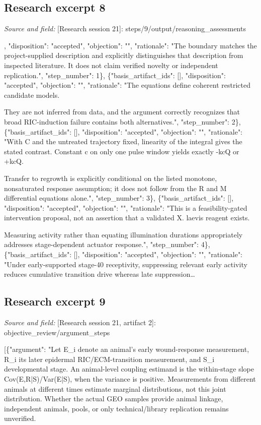 \documentclass[11pt]{article}
\begin{document}
\subsection{Research excerpt 8}
\textit{Source and field: }[Research session 21]: steps/9/output/reasoning\_assessments\par
[\{"basis\_artifact\_ids": [], "disposition": "accepted", "objection": "", "rationale": "The boundary matches the project-supplied description and explicitly distinguishes that description from inspected literature. It does not claim verified novelty or independent replication.", "step\_number": 1\}, \{"basis\_artifact\_ids": [], "disposition": "accepted", "objection": "", "rationale": "The equations define coherent restricted candidate models.

They are not inferred from data, and the argument correctly recognizes that broad RIC-induction failure contains both alternatives.", "step\_number": 2\}, \{"basis\_artifact\_ids": [], "disposition": "accepted", "objection": "", "rationale": "With C and the untreated trajectory fixed, linearity of the integral gives the stated contrast. Constant c on only one pulse window yields exactly -kcQ or +kcQ.

Transfer to regrowth is explicitly conditional on the listed monotone, nonsaturated response assumption; it does not follow from the R and M differential equations alone.", "step\_number": 3\}, \{"basis\_artifact\_ids": [], "disposition": "accepted", "objection": "", "rationale": "This is a feasibility-gated intervention proposal, not an assertion that a validated X. laevis reagent exists.

Measuring activity rather than equating illumination durations appropriately addresses stage-dependent actuator response.", "step\_number": 4\}, \{"basis\_artifact\_ids": [], "disposition": "accepted", "objection": "", "rationale": "Under early-supported stage-40 receptivity, suppressing relevant early activity reduces cumulative transition drive whereas late suppression\ldots{}

\subsection{Research excerpt 9}
\textit{Source and field: }[Research session 21, artifact 2]: objective\_review/argument\_steps\par
[\{"argument": "Let E\_i denote an animal's early wound-response measurement, R\_i its later epidermal RIC/ECM-transition measurement, and S\_i developmental stage. An animal-level coupling estimand is the within-stage slope Cov(E,R|S)/Var(E|S), when the variance is positive. Measurements from different animals at different times estimate marginal distributions, not this joint distribution. Whether the actual GEO samples provide animal linkage, independent animals, pools, or only technical/library replication remains unverified.
\end{document}
